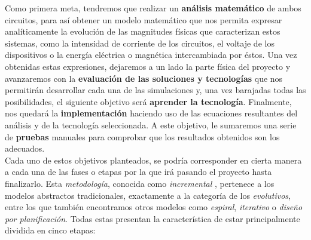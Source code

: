 \documentclass[../main.tex]{subfiles}
\begin{document}
Como primera meta, tendremos que realizar un \textbf{análisis matemático} de ambos circuitos, para así obtener un modelo matemático que nos permita expresar analíticamente la evolución de las magnitudes físicas que caracterizan estos sistemas, como la intensidad de corriente de los circuitos, el voltaje de los dispositivos o la energía eléctrica o magnética intercambiada por éstos. Una vez obtenidas estas expresiones, dejaremos a un lado la parte física del proyecto y avanzaremos con la \textbf{evaluación de las soluciones y tecnologías} que nos permitirán desarrollar cada una de las simulaciones y, una vez barajadas todas las posibilidades, el siguiente objetivo será \textbf{aprender la tecnología}. Finalmente, nos quedará la \textbf{implementación} haciendo uso de las ecuaciones resultantes del análisis y de la tecnología seleccionada. A este objetivo, le sumaremos una serie de \textbf{pruebas} manuales para comprobar que los resultados obtenidos son los adecuados.\\

Cada uno de estos objetivos planteados, se podría corresponder en cierta manera a cada una de las fases o etapas por la que irá pasando el proyecto hasta finalizarlo. Esta \textit{metodología}, conocida como \textit{incremental} \cite{metodologiasSoftware}, pertenece a los modelos abstractos tradicionales, exactamente a la categoría de los \textit{evolutivos}, entre los que también encontramos otros modelos como \textit{espiral}, \textit{iterativo} o \textit{diseño por planificación}. Todas estas presentan la característica de estar principalmente dividida en cinco etapas:
\end{document}

